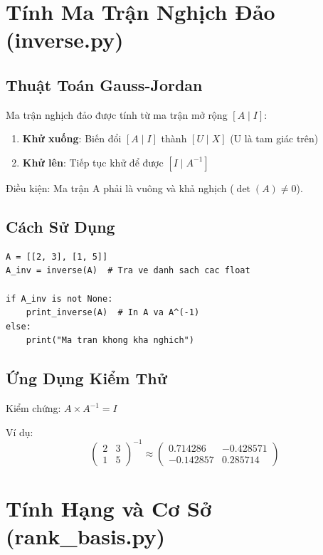\documentclass[12pt, a4paper, twoside]{article}
\begin{document}
\section{Tính Ma Trận Nghịch Đảo (inverse.py)}

\subsection{Thuật Toán Gauss-Jordan}

Ma trận nghịch đảo được tính từ ma trận mở rộng $[A \mid I]$:

\begin{enumerate}
    \item \textbf{Khử xuống}: Biến đổi $[A \mid I]$ thành $[U \mid X]$ (U là tam giác trên)
    \item \textbf{Khử lên}: Tiếp tục khử để được $[I \mid A^{-1}]$
\end{enumerate}

Điều kiện: Ma trận A phải là vuông và khả nghịch ($\det(A) \neq 0$).

\subsection{Cách Sử Dụng}

\begin{lstlisting}
A = [[2, 3], [1, 5]]
A_inv = inverse(A)  # Tra ve danh sach cac float

if A_inv is not None:
    print_inverse(A)  # In A va A^(-1)
else:
    print("Ma tran khong kha nghich")
\end{lstlisting}

\subsection{Ứng Dụng Kiểm Thử}

Kiểm chứng: $A \times A^{-1} = I$

Ví dụ:
\[
\begin{pmatrix} 2 & 3 \\ 1 & 5 \end{pmatrix}^{-1} \approx \begin{pmatrix} 0.714286 & -0.428571 \\ -0.142857 & 0.285714 \end{pmatrix}
\]

\section{Tính Hạng và Cơ Sở (rank\_basis.py)}
\end{document}
